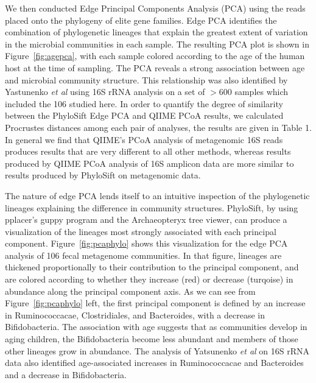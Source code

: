 \documentclass[10pt]{article}
\begin{document}
We then conducted Edge Principal Components Analysis (PCA) using the reads placed onto the phylogeny of elite gene families.
Edge PCA identifies the combination of phylogenetic lineages that explain the greatest extent of variation in the microbial communities in each sample.
The resulting PCA plot is shown in Figure~\ref{fig:agepca}, with each sample colored according to the age of the human host at the time of sampling.
The PCA reveals a strong association between age and microbial community structure.
This relationship was also identified by Yastunenko \textit{et al} using 16S rRNA analysis on a set of $>$600 samples which included the 106 studied here. In order to quantify the degree of similarity between the PhyloSift Edge PCA and QIIME PCoA results, we calculated Procrustes distances among each pair of analyses, the results are given in Table 1. In general we find that QIIME's PCoA analysis of metagenomic 16S reads produces results that are very different to all other methods, whereas results produced by QIIME PCoA analysis of 16S amplicon data are more similar to results produced by PhyloSift on metagenomic data.

The nature of edge PCA lends itself to an intuitive inspection of the phylogenetic lineages explaining the difference in community structures.
PhyloSift, by using pplacer's guppy program and the Archaeopteryx tree viewer, can produce a visualization of the lineages most strongly associated with each principal component.
Figure~\ref{fig:pcaphylo} shows this visualization for the edge PCA analysis of 106 fecal metagenome communities.
In that figure, lineages are thickened proportionally to their contribution to the principal component, and are colored according to whether they increase (red) or decrease (turqoise) in abundance along the principal component axis.
As we can see from Figure~\ref{fig:pcaphylo} left, the first principal component is defined by an increase in Ruminococcacae, Clostridiales, and Bacteroides, with a decrease in Bifidobacteria.
The association with age suggests that as communities develop in aging children, the Bifidobacteria become less abundant and members of those other lineages grow in abundance.
The analysis of Yatsunenko \textit{et al} on 16S rRNA data also identified age-associated increases in Ruminococcacae and Bacteroides and a decrease in Bifidobacteria.
\end{document}
